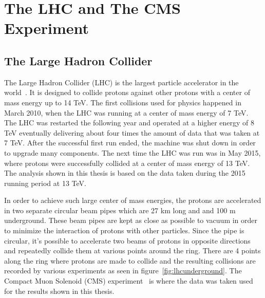 \chapter{The LHC and The CMS Experiment}
\label {ch:cms}

\section{The Large Hadron Collider}
The Large Hadron Collider (LHC) is the largest particle accelerator in the world~\cite{lhcmachine}.
It is designed to collide protons against other protons with a center of mass energy up to 14 TeV.
The first collisions used for physics happened in March 2010, when the LHC was running at a center of mass energy of 7 TeV.
The LHC was restarted the following year and operated at a higher energy of 8 TeV
eventually delivering about four times the amount of data that was taken at 7 TeV.
After the successful first run ended, the machine was shut down in order to upgrade many components.
The next time the LHC was run was in May 2015, where protons were successfully collided at a center of mass energy of 13 TeV.
The analysis shown in this thesis is based on the data taken during the 2015 running period at 13 TeV.

In order to achieve such large center of mass energies,
the protons are accelerated in two separate circular beam pipes which are 27 km long and and 100 m underground.
These beam pipes are kept as close as possible to vacuum in order to minimize the interaction of protons with other particles.
Since the pipe is circular,
it's possible to accelerate two beams of protons in opposite directions and repeatedly collide them at various points around the ring.
There are 4 points along the ring where protons are made to collide and the resulting collisions are recorded by various experiments as seen in figure~\ref{fig:lhcunderground}.
The Compact Muon Solenoid (CMS) experiment~\cite{jinst} is where the data was taken used for the results shown in this thesis.

